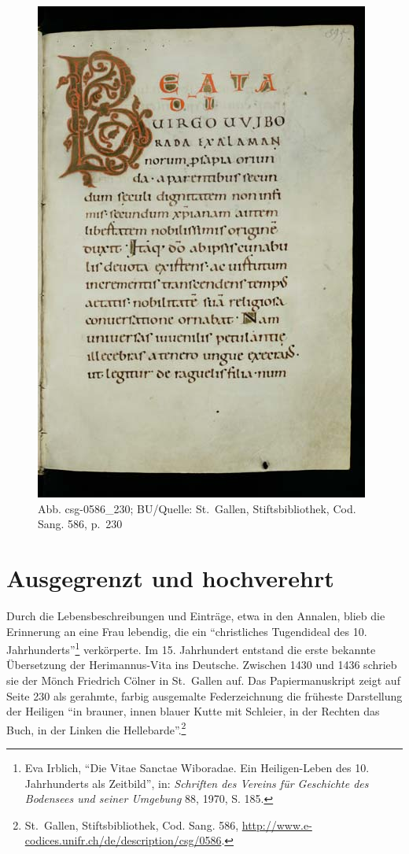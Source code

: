 \documentclass[a4paper,
fontsize=11pt,
oneside,
numbers=noperiodatend,
parskip=half-,
bibliography=totoc,
final
]{scrartcl}
\begin{document}
\begin{figure}[htbp]
\centering
\includegraphics{img/Voigt01.jpg}
\caption{Abb. csg-0586\_230; BU/Quelle: St.~Gallen, Stiftsbibliothek,
Cod. Sang. 586, p.~230}
\end{figure}

\section*{Ausgegrenzt und
hochverehrt}\label{ausgegrenzt-und-hochverehrt}

Durch die Lebensbeschreibungen und Einträge, etwa in den Annalen, blieb
die Erinnerung an eine Frau lebendig, die ein \enquote{christliches
Tugendideal des 10. Jahrhunderts}\footnote{Eva Irblich, \enquote{Die
  Vitae Sanctae Wiboradae. Ein Heiligen-Leben des 10. Jahrhunderts als
  Zeitbild}, in: \emph{Schriften des Vereins für Geschichte des
  Bodensees und seiner Umgebung} 88, 1970, S. 185.} verkörperte. Im 15.
Jahrhundert entstand die erste bekannte Übersetzung der Herimannus-Vita
ins Deutsche. Zwischen 1430 und 1436 schrieb sie der Mönch Friedrich
Cölner in St.~Gallen auf. Das Papiermanuskript zeigt auf Seite 230 als
gerahmte, farbig ausgemalte Federzeichnung die früheste Darstellung der
Heiligen \enquote{in brauner, innen blauer Kutte mit Schleier, in der
Rechten das Buch, in der Linken die Hellebarde}.\footnote{St.~Gallen,
  Stiftsbibliothek, Cod. Sang. 586,
  \url{http://www.e-codices.unifr.ch/de/description/csg/0586}.}
\end{document}
